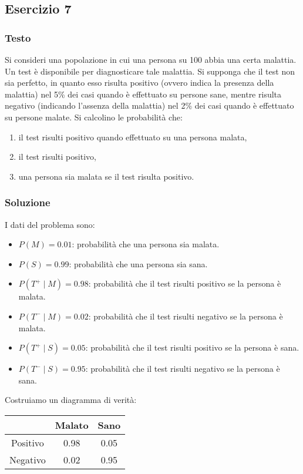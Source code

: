 \subsection{Esercizio 7}
\subsubsection{Testo}
Si consideri una popolazione in cui una persona su 100 abbia una certa malattia. Un test è disponibile per diagnosticare tale malattia. Si supponga che il test non sia perfetto, in quanto esso risulta positivo (ovvero indica la presenza della malattia) nel 5\% dei casi quando è effettuato su persone sane, mentre risulta negativo (indicando l’assenza della malattia) nel 2\% dei casi quando è effettuato su persone malate. Si calcolino le probabilità che:
\begin{enumerate}[label=(\alph*)]
    \item il test risulti positivo quando effettuato su una persona malata,
    \item il test risulti positivo,
    \item una persona sia malata se il test risulta positivo.
\end{enumerate}

\subsubsection{Soluzione}
I dati del problema sono: 
\begin{itemize}
    \item \(P(M)=0.01\): probabilità che una persona sia malata.
    \item \(P(S)=0.99\): probabilità che una persona sia sana.
    \item \(P(T^+ \mid M)=0.98\): probabilità che il test risulti positivo se la persona è malata.
    \item \(P(T^- \mid M)=0.02\): probabilità che il test risulti negativo se la persona è malata.
    \item \(P(T^+ \mid S)=0.05\): probabilità che il test risulti positivo se la persona è sana.
    \item \(P(T^- \mid S)=0.95\): probabilità che il test risulti negativo se la persona è sana.
\end{itemize}


Costruiamo un diagramma di verità:
\begin{center}
    \begin{tabular}{|c|c|c|}
        \hline
        & Malato & Sano \\
        \hline
        Positivo & 0.98 & 0.05 \\
        \hline
        Negativo & 0.02 & 0.95 \\
        \hline
    \end{tabular}
\end{center}


